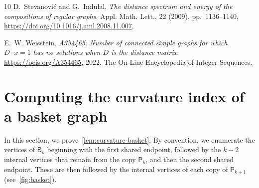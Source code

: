 \documentclass[11pt,a4paper]{article}
\newcommand{\Path}{\mathsf{P}}
\newcommand{\Basket}{\mathsf{B}}
\begin{document}
\begin{thebibliography}{10}
        {\sc D.~Stevanovi\'c and G.~Indulal}, {\em The distance spectrum and energy of the compositions of regular graphs}, Appl. Math. Lett., 22 (2009), pp.~1136--1140, \url{https://doi.org/10.1016/j.aml.2008.11.007}.
        
        {\sc E.~W. Weisstein}, {\em {A354465}: Number of connected simple graphs for which ${D} \cdot x = 1$ has no solutions when ${D}$ is the distance matrix}.
        \newblock \url{https://oeis.org/A354465}, 2022.
        \newblock The On-Line Encyclopedia of Integer Sequences.
        
    \end{thebibliography}

    \appendix

    \section{Computing the curvature index of a basket graph}\label{sec:appendix-basket}

    In this section, we prove~\cref{lem:curvature-basket}. By convention, we enumerate the vertices of $\Basket_k$ beginning with the first shared endpoint, followed by the $k-2$ internal vertices that remain from the copy $\Path_{k}$, and then the second shared endpoint. These are then followed by the internal vertices of each copy of $\Path_{k+1}$ (see~\cref{fig:basket}). 
\end{document}
